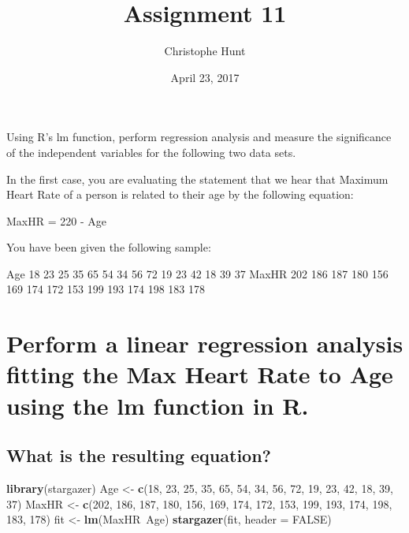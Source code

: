 \documentclass[]{article}
\title{Assignment 11}
\author{Christophe Hunt}
\date{April 23, 2017}
\newenvironment{Shaded}{\begin{snugshade}}{\end{snugshade}}
\newcommand{\KeywordTok}[1]{\textcolor[rgb]{0.13,0.29,0.53}{\textbf{{#1}}}}
\newcommand{\DataTypeTok}[1]{\textcolor[rgb]{0.13,0.29,0.53}{{#1}}}
\newcommand{\DecValTok}[1]{\textcolor[rgb]{0.00,0.00,0.81}{{#1}}}
\newcommand{\StringTok}[1]{\textcolor[rgb]{0.31,0.60,0.02}{{#1}}}
\newcommand{\OtherTok}[1]{\textcolor[rgb]{0.56,0.35,0.01}{{#1}}}
\newcommand{\NormalTok}[1]{{#1}}
\begin{document}
\maketitle

{
\setcounter{tocdepth}{2}
\tableofcontents
}
\newpage

Using R's lm function, perform regression analysis and measure the
significance of the independent variables for the following two data
sets.

In the first case, you are evaluating the statement that we hear that
Maximum Heart Rate of a person is related to their age by the following
equation:

MaxHR = 220 - Age

You have been given the following sample:

Age 18 23 25 35 65 54 34 56 72 19 23 42 18 39 37 \newline
MaxHR 202 186 187 180 156 169 174 172 153 199 193 174 198 183 178

\section{Perform a linear regression analysis fitting the Max Heart Rate
to Age using the lm function in
R.}\label{perform-a-linear-regression-analysis-fitting-the-max-heart-rate-to-age-using-the-lm-function-in-r.}

\subsection{What is the resulting
equation?}\label{what-is-the-resulting-equation}

\begin{Shaded}
\begin{Highlighting}[]
\KeywordTok{library}\NormalTok{(stargazer)}
\NormalTok{Age <-}\StringTok{ }\KeywordTok{c}\NormalTok{(}\DecValTok{18}\NormalTok{, }\DecValTok{23}\NormalTok{, }\DecValTok{25}\NormalTok{, }\DecValTok{35}\NormalTok{, }\DecValTok{65}\NormalTok{, }\DecValTok{54}\NormalTok{, }\DecValTok{34}\NormalTok{, }\DecValTok{56}\NormalTok{, }\DecValTok{72}\NormalTok{, }\DecValTok{19}\NormalTok{, }\DecValTok{23}\NormalTok{, }\DecValTok{42}\NormalTok{, }\DecValTok{18}\NormalTok{, }\DecValTok{39}\NormalTok{, }\DecValTok{37}\NormalTok{)}
\NormalTok{MaxHR <-}\StringTok{ }\KeywordTok{c}\NormalTok{(}\DecValTok{202}\NormalTok{, }\DecValTok{186}\NormalTok{, }\DecValTok{187}\NormalTok{, }\DecValTok{180}\NormalTok{, }\DecValTok{156}\NormalTok{, }\DecValTok{169}\NormalTok{, }\DecValTok{174}\NormalTok{, }\DecValTok{172}\NormalTok{, }\DecValTok{153}\NormalTok{, }\DecValTok{199}\NormalTok{, }\DecValTok{193}\NormalTok{, }\DecValTok{174}\NormalTok{, }\DecValTok{198}\NormalTok{, }\DecValTok{183}\NormalTok{, }\DecValTok{178}\NormalTok{)}
\NormalTok{fit <-}\StringTok{ }\KeywordTok{lm}\NormalTok{(MaxHR~Age)}
\KeywordTok{stargazer}\NormalTok{(fit, }\DataTypeTok{header =} \OtherTok{FALSE}\NormalTok{)}
\end{Highlighting}
\end{Shaded}
\end{document}
